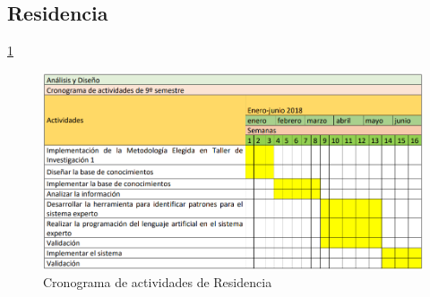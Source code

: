     \subsection{Residencia}\ref{Residencia}

    \begin{figure}[h]
      \centering
      \includegraphics[scale=.7]{lib/assets/cronograma-8-9-2}
      \caption{Cronograma de actividades de Residencia}
      \label{Residencia}
    \end{figure}
